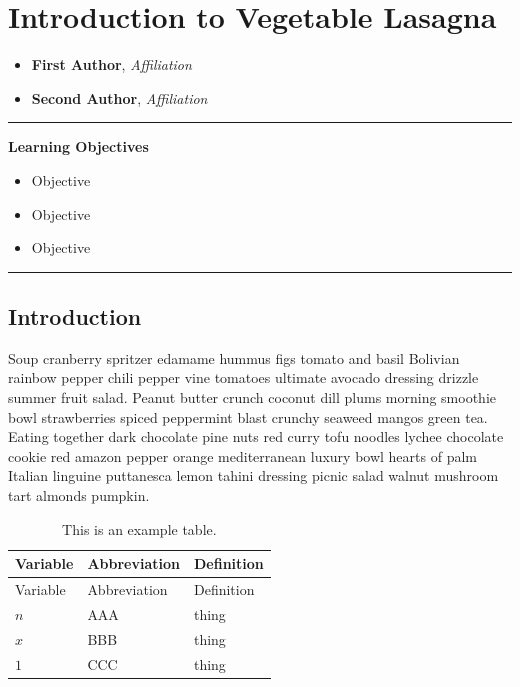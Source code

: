 \documentclass{book}
\providecommand{\tightlist}{%
  \setlength{\itemsep}{0pt}\setlength{\parskip}{0pt}}
\begin{document}
\hypertarget{introduction-to-vegetable-lasagna}{%
\chapter{Introduction to Vegetable
Lasagna}\label{introduction-to-vegetable-lasagna}}

\begin{itemize}
\tightlist
\item
  \textbf{First Author}, \emph{Affiliation}
\item
  \textbf{Second Author}, \emph{Affiliation}
\end{itemize}

\begin{center}\rule{0.5\linewidth}{0.5pt}\end{center}

\textbf{Learning Objectives}

\begin{itemize}
\tightlist
\item
  Objective
\item
  Objective
\item
  Objective
\end{itemize}

\begin{center}\rule{0.5\linewidth}{0.5pt}\end{center}

\hypertarget{introduction}{%
\section{Introduction}\label{introduction}}

Soup cranberry spritzer edamame hummus figs tomato and basil Bolivian rainbow
pepper chili pepper vine tomatoes ultimate avocado dressing drizzle summer
fruit salad. Peanut butter crunch coconut dill plums morning smoothie bowl
strawberries spiced peppermint blast crunchy seaweed mangos green tea. Eating
together dark chocolate pine nuts red curry tofu noodles lychee chocolate
cookie red amazon pepper orange mediterranean luxury bowl hearts of palm
Italian linguine puttanesca lemon tahini dressing picnic salad walnut mushroom
tart almonds pumpkin.

\hypertarget{tbl:variables}{}
\begin{longtable}[]{@{}lll@{}}
\caption{\label{tbl:variables}This is an example table.}\tabularnewline
\toprule
Variable & Abbreviation & Definition \\
\midrule
\endfirsthead
\toprule
Variable & Abbreviation & Definition \\
\midrule
\endhead
\(n\) & AAA & thing \\
\(x\) & BBB & thing \\
\(1\) & CCC & thing \\
\bottomrule
\end{longtable}
\end{document}

